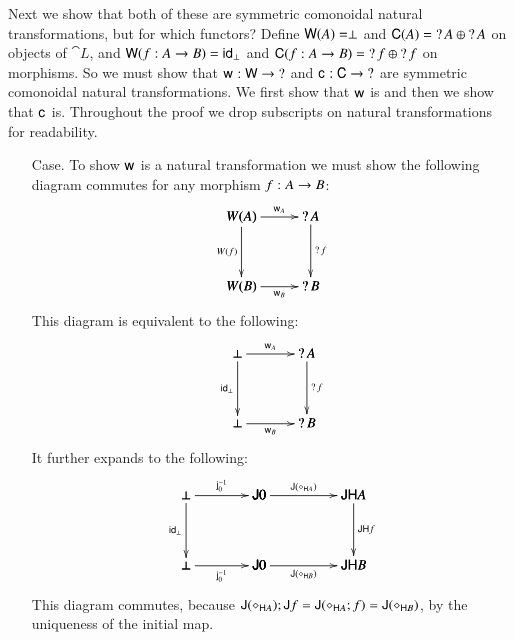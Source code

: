 Next we show that both of these are symmetric comonoidal natural
transformations, but for which functors?  Define $\mathsf{W}(A) =
\perp$ and $\mathsf{C}(A) = \mathop{?} A \oplus \mathop{?} A$ on objects of
$\cat{L}$, and $\mathsf{W}(f : A \rightarrow B) = \mathsf{id}_\perp$ and $\mathsf{C}(f
: A \rightarrow B) = \mathop{?} f \oplus \mathop{?} f$ on morphisms.  So we must show
that $\mathsf{w}_{} : \mathsf{W} \rightarrow \mathop{?}$ and $\mathsf{c}_{} : \mathsf{C} \rightarrow \mathop{?}$ are
symmetric comonoidal natural transformations.  We first show that
$\mathsf{w}_{}$ is and then we show that $\mathsf{c}_{}$ is.  Throughout the proof we
drop subscripts on natural transformations for readability.
\begin{itemize}
\item[Case.] To show $\mathsf{w}_{}$ is a natural transformation we must show
  the following diagram commutes for any morphism $f : A \rightarrow B$:
  \[
  \bfig
  \square[W(A)`\wn A`W(B)`\wn B;\w{A}`W(f)`\wn f`\w{B}]
  \efig
  \]
  This diagram is equivalent to the following:
  \[
  \bfig
  \square[\perp`\wn A`\perp`\wn B;\w{A}`\id_{\perp}`\wn f`\w{B}]
  \efig
  \]
  It further expands to the following:
  \[
  \bfig
  \hSquares/->`->`->``->`->`->/[\perp`\func{J}0`\func{JH}A`\perp`\func{J}0`\func{JH}B;\jinv{0}`\func{J}(\diamond_{\func{H}A})`\id_\perp``\func{JH}f`\jinv{0}`\func{J}(\diamond_{\func{H}B})]
  \efig
  \]
  This diagram commutes, because
  $\mathsf{J}(\diamond_{\mathsf{H}A});\mathsf{J}f =
  \mathsf{J}(\diamond_{\mathsf{H}A};f) =
  \mathsf{J}(\diamond_{\mathsf{H}B})$, by the uniqueness of the initial
  map.


\end{itemize}
